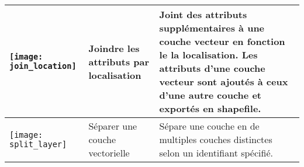 \begin{table}[ht]
\begin{tabular}{|p{0.3in}|p{1.3in}|p{4.6in}|}
 \hline \texttt{[image: join\_location]} & Joindre les attributs par localisation & Joint des attributs supplémentaires à une couche vecteur en fonction le la localisation. Les attributs d'une couche vecteur sont ajoutés à ceux d'une autre couche et exportés en shapefile. \\
 \hline \texttt{[image: split\_layer]} & Séparer une couche vectorielle & Sépare une couche en de multiples couches distinctes selon un identifiant spécifié. \\
 \hline
\end{tabular}
\end{table}
